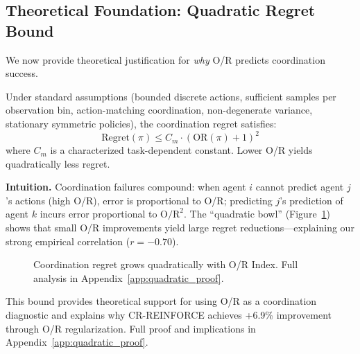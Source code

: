 
\subsection{Theoretical Foundation: Quadratic Regret Bound}
\label{subsec:quadratic_regret}

We now provide theoretical justification for \textit{why} O/R predicts coordination success.

\begin{proposition}
\label{prop:quadratic_regret}
Under standard assumptions (bounded discrete actions, sufficient samples per observation bin, action-matching coordination, non-degenerate variance, stationary symmetric policies), the coordination regret satisfies:
\begin{equation}
\text{Regret}(\pi) \leq C_m \cdot (\text{OR}(\pi) + 1)^2
\end{equation}
where $C_m$ is a characterized task-dependent constant. Lower O/R yields quadratically less regret.
\end{proposition}

\textbf{Intuition.} Coordination failures compound: when agent $i$ cannot predict agent $j$'s actions (high O/R), error is proportional to O/R; predicting $j$'s prediction of agent $k$ incurs error proportional to $\text{O/R}^2$. The ``quadratic bowl'' (Figure~\ref{fig:quadratic_bowl}) shows that small O/R improvements yield large regret reductions—explaining our strong empirical correlation ($r = -0.70$).

\begin{figure}[h]
\centering
{}
\caption{Coordination regret grows quadratically with O/R Index. Full analysis in Appendix~\ref{app:quadratic_proof}.}
\label{fig:quadratic_bowl}
\end{figure}

This bound provides theoretical support for using O/R as a coordination diagnostic and explains why CR-REINFORCE achieves +6.9\% improvement through O/R regularization. Full proof and implications in Appendix~\ref{app:quadratic_proof}.
